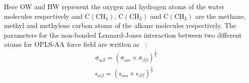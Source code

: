  \begin{table}[H]
\centering
\caption [Force-field (non-bonded) parameters for SPC/E water, OPLS-AA Alkanes, NO, CO and N2.] {Force-field (non-bonded) parameters for SPC/E water, OPLS-AA Alkanes, NO, CO and N2.}
\label{non-bonded}
\end{table}
\noindent Here OW and HW represent the oxygen and hydrogen atoms of the water molecules respectively and $ \mathrm{C(CH_4)}$, $ \mathrm{C(CH_3)}$ and  $ \mathrm{C(CH_2)}$ are the methane, methyl and methylene carbon atoms of the alkane molecules respectively. The parameters for the non-bonded Lennard-Jones interaction between two different atoms for OPLS-AA force field  are written as~ 
 \citep{Gromacs-manual}: 
\begin{eqnarray} 
\mathrm{\sigma}_{\alpha\beta} =  \left(\mathrm{\sigma}_{\alpha\alpha} \times \mathrm{\sigma}_{\beta\beta} \right)^{\frac{1}{2}}\\
\mathrm{\epsilon}_{\alpha\beta} = \left(\mathrm{\epsilon}_{\alpha\alpha} \times \mathrm{\epsilon}_{\beta\beta} \right)^{\frac{1}{2}} 
\end{eqnarray}

